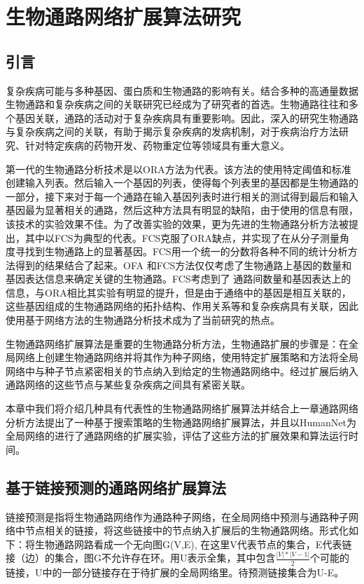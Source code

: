\chapter{生物通路网络扩展算法研究}
\section{引言}
复杂疾病可能与多种基因、蛋白质和生物通路的影响有关\cite{大师兄[1]}。结合多种的高通量数据生物通路和复杂疾病之间的关联研究已经成为了研究者的首选。生物通路往往和多个基因关联，通路的活动对于复杂疾病具有重要影响。因此，深入的研究生物通路与复杂疾病之间的关联，有助于揭示复杂疾病的发病机制，对于疾病治疗方法研究、针对特定疾病的药物开发、药物重定位等领域具有重大意义。

第一代的生物通路分析技术是以ORA\cite{goeman2007analyzing}方法为代表。该方法的使用特定阈值和标准创建输入列表。然后输入一个基因的列表，使得每个列表里的基因都是生物通路的一部分，接下来对于每一个通路在输入基因列表时进行相关的测试得到最后和输入基因最为显著相关的通路，然后这种方法具有明显的缺陷，由于使用的信息有限，该技术的实验效果不佳。为了改善实验的效果，更为先进的生物通路分析方法被提出，其中以FCS\cite{lee2011prioritizing}为典型的代表。FCS克服了ORA缺点，并实现了在从分子测量角度寻找到生物通路上的显著基因。FCS用一个统一的分数将各种不同的统计分析方法得到的结果结合了起来。OFA 和FCS方法仅仅考虑了生物通路上基因的数量和基因表达信息来确定关键的生物通路。FCS\cite{lee2011prioritizing}考虑到了
通路间数量和基因表达上的信息，与ORA相比其实验有明显的提升，但是由于通络中的基因是相互关联的，这些基因组成的生物通路网络的拓扑结构、作用关系等和复杂疾病具有关联，因此使用基于网络方法的生物通路分析技术成为了当前研究的热点。

生物通路网络扩展算法是重要的生物通路分析方法，生物通路扩展的步骤是：在全局网络上创建生物通路网络并将其作为种子网络，使用特定扩展策略和方法将全局网络中与种子节点紧密相关的节点纳入到给定的生物通路网络中。经过扩展后纳入通路网络的这些节点与某些复杂疾病之间具有紧密关联。

本章中我们将介绍几种具有代表性的生物通路网络扩展算法并结合上一章通路网络分析方法提出了一种基于搜索策略的生物通路网络扩展算法，并且以HumanNet为全局网络的进行了通路网络的扩展实验，评估了这些方法的扩展效果和算法运行时间。

\section{基于链接预测的通路网络扩展算法}
链接预测是指将生物通路网络作为通路种子网络，在全局网络中预测与通路种子网络中节点相关的链接，将这些链接中的节点纳入扩展后的生物通路网络。形式化如下：将生物通路网路看成一个无向图G(V,E), 在这里V代表节点的集合，E代表链接（边）的集合，图G不允许存在环。用U表示全集，其中包含$\frac{|V|*|V-1|}{2}$个可能的链接，U中的一部分链接存在于待扩展的全局网络里。待预测链接集合为U-E。

